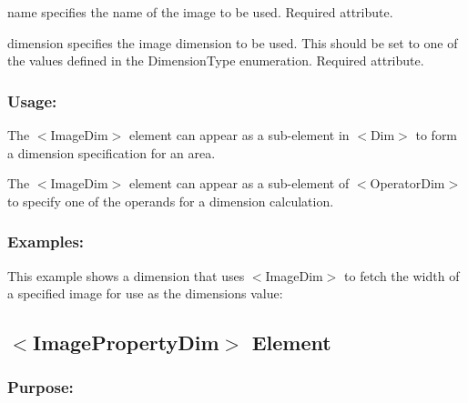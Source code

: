\begin{DoxyItemize}
\item {\ttfamily name} specifies the name of the image to be used. Required attribute. \item {\ttfamily dimension} specifies the image dimension to be used. This should be set to one of the values defined in the Dimension\+Type enumeration. Required attribute.\end{DoxyItemize}
\hypertarget{fal_element_ref_fal_elem_ref_sec_19_3}{}\subsubsection{Usage\+:}\label{fal_element_ref_fal_elem_ref_sec_19_3}

\begin{DoxyItemize}
\item The {\ttfamily $<$Image\+Dim$>$} element can appear as a sub-\/element in {\ttfamily $<$Dim$>$} to form a dimension specification for an area. 
\item The {\ttfamily $<$Image\+Dim$>$} element can appear as a sub-\/element of {\ttfamily $<$Operator\+Dim$>$} to specify one of the operands for a dimension calculation. 
\end{DoxyItemize}\hypertarget{fal_element_ref_fal_elem_ref_sec_19_4}{}\subsubsection{Examples\+:}\label{fal_element_ref_fal_elem_ref_sec_19_4}
This example shows a dimension that uses {\ttfamily $<$Image\+Dim$>$} to fetch the width of a specified image for use as the dimensions value\+: 
\begin{DoxyCode}{0}
\end{DoxyCode}
\hypertarget{fal_element_ref_fal_elem_ref_sec_imagepropertydim}{}\subsection{$<$\+Image\+Property\+Dim$>$ Element}\label{fal_element_ref_fal_elem_ref_sec_imagepropertydim}
\hypertarget{fal_element_ref_fal_elem_ref_sec_imagepropertydim_1}{}\subsubsection{Purpose\+:}\label{fal_element_ref_fal_elem_ref_sec_imagepropertydim_1}

